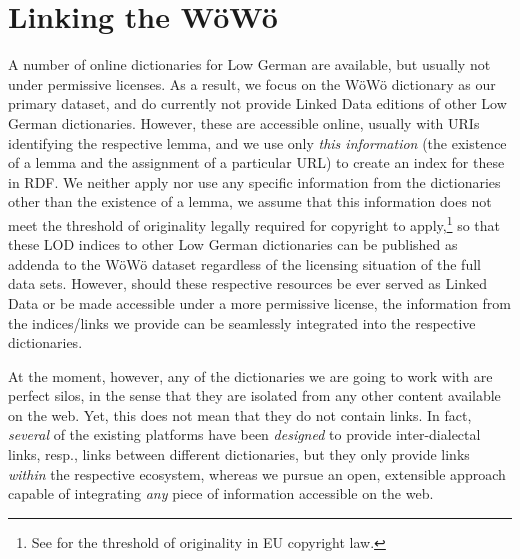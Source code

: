 \section{Linking the WöWö}

A number of online dictionaries for Low German are available, but usually not under permissive licenses. As a result, we focus on the WöWö dictionary as our primary dataset, and do currently not provide Linked Data editions of other Low German dictionaries. However, these are accessible online, usually with URIs identifying the respective lemma, and we use only \emph{this information} (the existence of a lemma and the assignment of a particular URL) to create an index for these in RDF. We neither apply nor use any specific information from the dictionaries other than the existence of a lemma, we assume that this information does not meet the threshold of originality legally required for copyright to apply,\footnote{See \citet{Margoni2016} for the threshold of originality in EU copyright law.}
so that these LOD indices to other Low German dictionaries can be published as addenda to the WöWö dataset regardless of the licensing situation of the full data sets. However, should these respective resources be ever served as Linked Data or be made accessible under a more permissive license, the information from the indices/links we provide can be seamlessly integrated into the respective dictionaries.

At the moment, however, any of the dictionaries we are going to work with are perfect silos, in the sense that they are isolated from any other content available on the web. Yet, this does not mean that they do not contain links. In fact, \emph{several} of the existing platforms have been \emph{designed} to provide inter-dialectal links, resp., links between different dictionaries, but they only provide links \emph{within} the respective ecosystem, whereas we pursue an open, extensible approach capable of integrating \emph{any} piece of information accessible on the web. 

